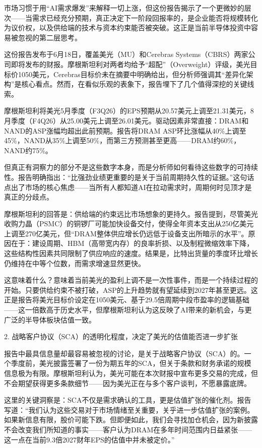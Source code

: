 \documentclass[11pt]{ctexart}
\begin{document}
市场习惯于用“AI需求爆发”来解释一切上涨，但这份报告揭示了一个更微妙的层次——当需求已经充分预期，真正决定下一阶段回报率的，是企业能否将规模转化为议价权，以及供给端的技术与资本约束能否被突破。这正是当前半导体投资中容易被忽视的第二层思考。

这份报告发布于6月18日，覆盖美光（MU）和Cerebras Systems（CBRS）两家公司即将发布的财报。摩根斯坦利对两者均给予“超配”（Overweight）评级，美光目标价1050美元，Cerebras目标价未在摘要中明确给出，但分析师强调其“差异化架构”是核心看点。然而，在看似乐观的表象下，报告埋下了几个值得深挖的关键线索。

摩根斯坦利将美光5月季度（F3Q26）的EPS预期从20.57美元上调至21.31美元，8月季度（F4Q26）从25.00美元上调至26.01美元。驱动因素非常直接：DRAM和NAND的ASP涨幅均超出此前预期。报告将DRAM ASP环比涨幅从40\%上调至45\%，NAND从35\%上调至50\%，而第三方预测甚至更高——DRAM约60\%，NAND约75\%。

但真正有洞察力的部分不是这些数字本身，而是分析师如何看待这些数字的可持续性。报告明确指出：“比强劲业绩更重要的是关于当前周期持久性的证据。”这句话点出了市场的核心焦虑——当所有人都知道AI在拉动需求时，周期何时见顶才是真正的分歧点。

摩根斯坦利的回答是：供给端的约束远比市场想象的更持久。报告提到，尽管美光收购力晶（PSMC）的铜锣厂可能加快设备交付，使得全年资本支出从250亿美元上调至270亿美元，但“DRAM整体供应增长仍远低于设备支出所暗示的水平”。原因在于：建设周期、HBM（高带宽内存）的良率折损、以及制程微缩效率下降，这些结构性因素共同限制了供应响应的速度。结果是，比特出货量的季度环比增长仍维持在中等个位数，而需求增速显然更快。

这意味着什么？意味着当前美光的盈利上调不是一次性事件，而是一个持续过程的开始。只要供给约束不被打破，ASP的上升趋势就有望延续到2027年甚至更远。这正是报告将美光目标价设定在1050美元、基于29.5倍周期中段市盈率的逻辑基础——这一倍数高于历史水平，但摩根斯坦利认为这反映了AI带来的新机会，与更广泛的半导体板块估值一致。

2. 战略客户协议（SCA）的透明化程度，决定了美光的估值能否进一步扩张

报告中最具信息量却最容易被忽视的讨论，是关于战略客户协议（SCA）的。一个季度前，美光披露签署了一份为期五年的SCA，但关于条款和财务承诺的规模信息极为有限。摩根斯坦利认为，美光可能在本次财报中宣布更多交易的完成，但不会期望获得更多条款细节——因为美光正在与多个客户谈判，不愿暴露底牌。

这里的关键洞察是：SCA不仅是需求确认的工具，更是估值扩张的催化剂。报告写道：“我们认为这些交易对于市场情绪至关重要，关乎进一步估值扩张的案例。如果新信息有限，股价可能下跌。但即便如此，我们会寻找加仓机会，因为新披露不会改变我们所知道的事实——客户认为DRAM在多年时间范围内日益紧张——这一点在当前9.3倍2027财年EPS的估值中并未被定价。”
\end{document}
